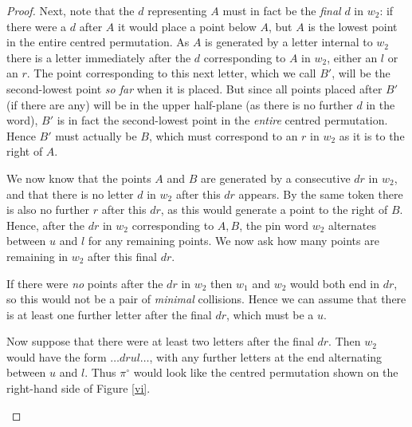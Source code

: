 \documentclass[11pt,a4paper]{article}
\newcommand{\plotptradius}{4pt}
\theoremstyle{definition}
\begin{document}
\begin{proof}
Next, note that the $d$ representing $A$ must in fact be the \emph{final} $d$ in $w_{2}$: if there were a $d$ after $A$ it would place a point below $A$, but $A$ is the lowest point in the entire centred permutation. As $A$ is generated by a letter internal to $w_{2}$ there is a letter immediately after the $d$ corresponding to $A$ in $w_{2}$, either an $l$ or an $r$. The point corresponding to this next letter, which we call $B'$, will be the second-lowest point \emph{so far} when it is placed. But since all points placed after $B'$ (if there are any) will be in the upper half-plane (as there is no further $d$ in the word), $B'$ is in fact the second-lowest point in the \emph{entire} centred permutation. Hence $B'$ must actually be $B$, which must correspond to an $r$ in $w_{2}$ as it is to the right of $A$.

We now know that the points $A$ and $B$ are generated by a consecutive $dr$ in $w_{2}$, and that there is no letter $d$ in $w_{2}$ after this $dr$ appears. By the same token there is also no further $r$ after this $dr$, as this would generate a point to the right of $B$. Hence, after the $dr$ in $w_{2}$ corresponding to $A,B$, the pin word $w_{2}$ alternates between $u$ and $l$ for any remaining points. We now ask how many points are remaining in $w_{2}$ after this final $dr$.

If there were \emph{no} points after the $dr$ in $w_{2}$ then $w_{1}$ and $w_{2}$ would both end in $dr$, so this would not be a pair of \emph{minimal} collisions. Hence we can assume that there is at least one further letter after the final $dr$, which must be a $u$.

Now suppose that there were at least two letters after the final $dr$. Then $w_{2}$ would have the form $\dots drul \dots$, with any further letters at the end alternating between $u$ and $l$. Thus $\pi^{\circ}$ would look like the centred permutation shown on the right-hand side of Figure \ref{vi}.

\begin{figure}[h]
\begin{center}
\end{center}
\end{figure}
\end{proof}
\end{document}

